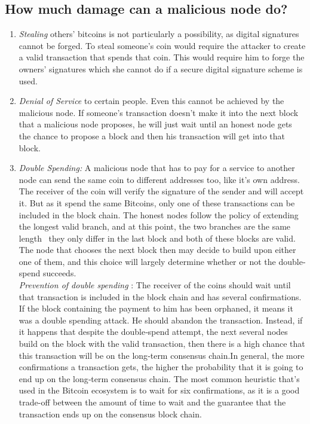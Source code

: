 \documentclass[10pt,a4paper]{article}
\begin{document}
\subsection{How much damage can a malicious node do?}
\begin{enumerate}
\item \emph{Stealing } others' bitcoins is not particularly a possibility, as digital signatures cannot be forged. To steal someone's coin would require the attacker to create a valid transaction that spends that coin. This
would require him to forge the owners’ signatures which she cannot do if a secure digital signature scheme is used.

\item \emph{Denial of Service} to certain people. Even this cannot be achieved by the malicious node. If someone's transaction doesn’t make it into the next block that a malicious node proposes, he will just wait until an honest node gets the chance to propose a block and then his transaction will get into that block.

\item \emph{Double Spending: } A malicious node that has to pay for a service to another node can send the same coin to     different addresses too, like it's own address. The receiver of the coin will verify the signature of the sender and will accept it. But as it spend the same Bitcoins, only one of these transactions can be included in the block chain. The honest nodes follow the policy of extending the longest valid branch, and at this point, the two branches are the same length \textendash \ they only differ in the last block and both of these blocks are valid. The node that chooses the next block
then may decide to build upon either one of them, and this choice will largely determine whether or not the double‐spend succeeds.\\

\emph{Prevention of double spending }: The receiver of the coins should wait until that transaction is included in the block chain and has several confirmations. If the block containing the payment to him has been orphaned, it means it was a double spending attack. He should abandon the transaction. Instead, if it happens that despite the double‐spend attempt, the next several nodes build on the block with the valid transaction, then there is a high chance that  this transaction will be on the long‐term consensus chain.In general, the more confirmations a transaction gets, the higher the probability that it is going to end up on the long‐term consensus chain. The most common heuristic that’s used in the Bitcoin ecosystem is to wait for six confirmations, as it is a good trade-off between the amount of time to wait and the guarantee that the transaction ends up on the consensus block chain.
\end{enumerate}
\end{document}
